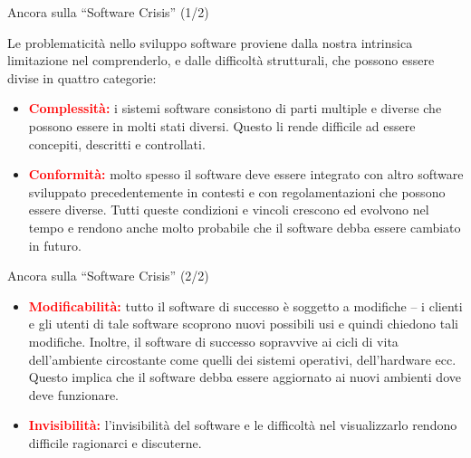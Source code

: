 \documentclass{beamer}
\begin{document}
\begin{frame}{\centerline{Ancora sulla ``Software Crisis'' (1/2)}}
Le problematicit\`{a} nello sviluppo software proviene dalla nostra intrinsica limitazione nel comprenderlo, e dalle difficolt\`{a} strutturali, che possono essere divise in quattro categorie:
\begin{itemize}
\item \textcolor{red}{\bf Complessit\`{a}:} i sistemi software consistono di parti multiple e diverse che possono essere in molti stati diversi. Questo li rende difficile ad essere concepiti, descritti e controllati.

\item \textcolor{red}{\bf Conformit\`{a}:} molto spesso il software deve essere integrato con altro software sviluppato precedentemente in contesti e con regolamentazioni che possono essere diverse. Tutti queste condizioni e vincoli crescono ed evolvono nel tempo e rendono anche molto probabile che il software debba essere cambiato in futuro.
\end{itemize}

\end{frame}

\begin{frame}{\centerline{Ancora sulla ``Software Crisis'' (2/2)}}
\begin{itemize}
\item \textcolor{red}{\bf Modificabilit\`{a}:} tutto il software di successo \`{e} soggetto a modifiche -- i clienti e gli utenti di tale software scoprono nuovi possibili usi e quindi chiedono tali modifiche. Inoltre, il software di successo sopravvive ai cicli di vita dell'ambiente circostante come quelli dei sistemi operativi, dell'hardware ecc. Questo implica che il software debba essere aggiornato ai nuovi ambienti dove deve funzionare. 

\item \textcolor{red}{\bf Invisibilit\`{a}:} l'invisibilit\`{a} del software e le difficolt\`{a} nel visualizzarlo rendono difficile ragionarci e discuterne.

\end{itemize}
\end{frame}
\end{document}
